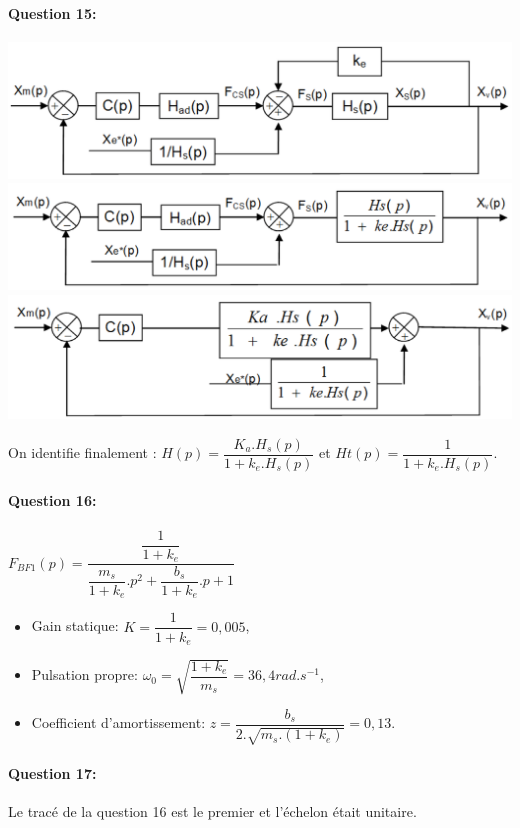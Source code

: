 \paragraph{Question 15:}

\begin{center}
 \includegraphics[width=0.7\linewidth]{img/sb1} \\
 \includegraphics[width=0.7\linewidth]{img/sb2} \\
 \includegraphics[width=0.7\linewidth]{img/sb3}
\end{center}

On identifie finalement : $H(p)=\dfrac{K_a.H_s(p)}{1+k_e.H_s(p)}$ et $Ht(p)=\dfrac{1}{1+k_e.H_s(p)}$.

\paragraph{Question 16:} $F_{BF1}(p)=\dfrac{\dfrac{1}{1+k_e}}{\dfrac{m_s}{1+k_e}.p^2+\dfrac{b_s}{1+k_e}.p+1}$

\begin{itemize}
 \item Gain statique: $K=\dfrac{1}{1+k_e}=0,005$,
 \item Pulsation propre: $\omega_0=\sqrt{\dfrac{1+k_e}{m_s}}=36,4rad.s^{-1}$,
 \item Coefficient d'amortissement: $z=\dfrac{b_s}{2.\sqrt{m_s.(1+k_e)}}=0,13$.
\end{itemize}

\paragraph{Question 17:}

Le tracé de la question 16 est le premier et l'échelon était unitaire.

